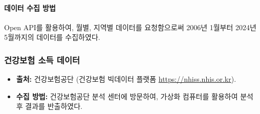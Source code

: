 \documentclass[a4paper,10pt]{article}
\begin{document}
\paragraph{데이터 수집 방법}
Open API를 활용하여, 월별, 지역별 데이터를 요청함으로써 2006년 1월부터 2024년 5월까지의 데이터를 수집하였다.

\subsubsection{건강보험 소득 데이터}
\begin{itemize}
    \item \textbf{출처:} 건강보험공단 (건강보험 빅데이터 플랫폼 \url{https://nhiss.nhis.or.kr}).
    \item \textbf{수집 방법:} 건강보험공단 분석 센터에 방문하여, 가상화 컴퓨터를 활용하여 분석 후 결과를 반출하였다.
\end{itemize}
\end{document}

